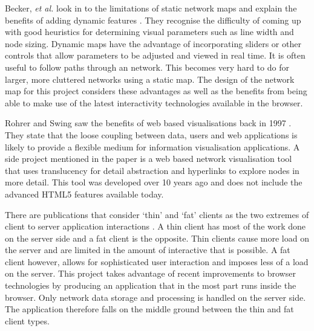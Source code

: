 \documentclass[11pt, a4paper]{article}
\begin{document}
Becker, \emph{et al.} look in to the limitations of static network maps and
explain the benefits of adding dynamic features \cite{Becker_1990}. They
recognise the difficulty of coming up with good heuristics for determining
visual parameters such as line width and node sizing. Dynamic maps have the
advantage of incorporating sliders or other controls that allow parameters to be
adjusted and viewed in real time. It is often useful to follow paths through an
network. This becomes very hard to do for larger, more cluttered networks using
a static map. The design of the network map for this project considers these
advantages as well as the benefits from being able to make use of the latest
interactivity technologies available in the browser.


Rohrer and Swing saw the benefits of web based visualisations back in 1997
\cite{Rohrer_1997}. They state that the loose coupling between data, users and
web applications is likely to provide a flexible medium for information
visualisation applications.  A side project mentioned in the paper is a web
based network visualisation tool that uses translucency for detail abstraction
and hyperlinks to explore nodes in more detail. This tool was developed over 10
years ago and does not include the advanced HTML5 features available today.

  
There are publications that consider `thin' and `fat' clients as the two
extremes of client to server application interactions
\cite{Eick_2007}\cite{Jern_1998}. A thin client has most of the work done on the
server side and a fat client is the opposite. Thin clients cause more load on
the server and are limited in the amount of interactive that is possible. A fat
client however, allows for sophisticated user interaction and imposes less of a
load on the server. This project takes advantage of recent improvements to
browser technologies by producing an application that in the most part runs
inside the browser. Only network data storage and processing is handled on the
server side. The application therefore falls on the middle ground between the
thin and fat client types.
\end{document}
